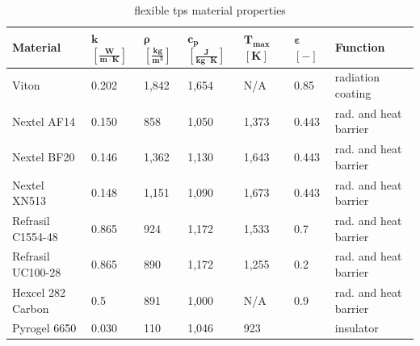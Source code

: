 \begin{table}[H]
	\caption {flexible \acrfull{tps} material properties}
	\centering
	\begin{tabular}{|l|l|l|l|l|l|l|}
		\hline
		\textbf{Material}         & \textbf{ $\mathbf{k}$ $\mathbf{\left[\frac{W}{m\cdot K}\right]} $} & \textbf{ $\mathbf{ \rho }$ $\mathbf{ \left[ \frac{kg}{m^3} \right] }$} & \textbf{  $\mathbf{ c_{p} }$ $\mathbf{ \left[ \frac{J}{kg \cdot K} \right] }$ }& \textbf{ $\mathbf{ T_{max} }$ $\mathbf{ [ K ] }$} &\textbf{ $\mathbf{ \varepsilon }$ $\mathbf{ [ - ] }$} & \textbf{Function} \\[1.6ex]   \hline \hline
		Viton       & 0.202 & 1,842 & 1,654 & N/A	 & 0.85 & radiation coating
		\\ \hline
		Nextel AF14       & 0.150                                                 & 858                                        & 1,050                                            & 1,373	 & 0.443    & rad. and heat barrier                                 \\ \hline
		Nextel BF20       & 0.146 
		& 1,362                                        & 1,130 
		& 1,643	 & 0.443  & rad. and heat barrier                                  
		\\ \hline
		Nextel XN513      & 0.148                                                 & 1,151                                       & 1,090                                            & 1,673	 & 0.443           & rad. and heat barrier                               \\ \hline
		Refrasil C1554-48 & 0.865                                                 & 924                                        & 1,172                                            & 1,533	 & 0.7     & rad. and heat barrier                                       \\ \hline
		Refrasil UC100-28 & 0.865                                                 & 890                                        & 1,172                                            & 1,255  & 0.2       & rad. and heat barrier                                    \\ \hline
		Hexcel 282 Carbon & 0.5                                                   & 891                                        & 1,000                                            & N/A 	 & 0.9      & rad. and heat barrier                                     \\ \hline
		Pyrogel 6650      & 0.030                                                 & 110                                        & 1,046                                            & 923    & ~        & insulator                                  \\ \hline

\end{tabular}
\end{table}
